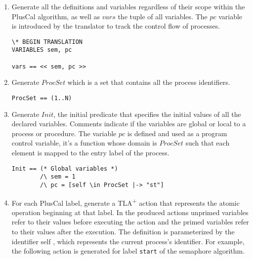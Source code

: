 \documentclass{thesul}
\newcommand{\tlaplus}{TLA\textsuperscript{+}\xspace}
\begin{document}
\begin{enumerate}
\item Generate all the definitions and variables regardless of their scope within the PlusCal algorithm, as well as $vars$ the tuple of all variables.
The $pc$ variable is introduced by the translator to track the control flow of processes.

\FloatBarrier
\begin{lstlisting}[frame = tlrb, firstnumber = 1,xleftmargin=.2\textwidth, xrightmargin=.2\textwidth]
\* BEGIN TRANSLATION
VARIABLES sem, pc

vars == << sem, pc >>

\end{lstlisting}

\item Generate $ProcSet$ which is a set that contains all the process identifiers.

\begin{lstlisting}[frame = tlrb, firstnumber = 1,xleftmargin=.2\textwidth, xrightmargin=.2\textwidth]
ProcSet == (1..N)

\end{lstlisting}

\item  Generate $Init$, the initial predicate that specifies the initial values of all the declared variables. Comments indicate if the variables are global or local to a process or procedure.
The variable $pc$ is defined and used as a program control variable, it's a function whose domain is $ProcSet$ such that each element is mapped to the entry label of the process.

\begin{lstlisting}[frame = tlrb, firstnumber = 1, xleftmargin=.2\textwidth, xrightmargin=.2\textwidth]
Init == (* Global variables *)
        /\ sem = 1
        /\ pc = [self \in ProcSet |-> "st"]

\end{lstlisting}

\item For each PlusCal label, generate a \tlaplus action that represents the atomic operation beginning at that label. 
In the produced actions unprimed variables refer to their values before executing the action and the primed variables refer to their values after the execution.
The definition is parameterized by the identifier self ,
which represents the current process's identifier. For example, the following action is generated for label \texttt{start} of the semaphore algorithm.


\end{enumerate}
\end{document}
